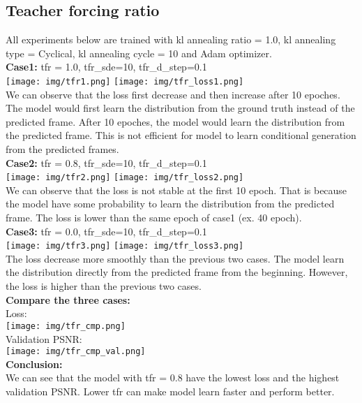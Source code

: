 \documentclass{article} %
\begin{document}
    \subsection{Teacher forcing ratio}
    All experiments below are trained with kl annealing ratio = 1.0, kl annealing type = Cyclical, kl annealing cycle = 10 and Adam optimizer.\\
    \textbf{Case1:} tfr = 1.0, tfr\_sde=10, tfr\_d\_step=0.1\\
    \texttt{[image: img/tfr1.png]}
    \texttt{[image: img/tfr\_loss1.png]} \\
    We can observe that the loss first decrease and then increase after 10 epoches.
    The model would first learn the distribution from the ground truth instead of the predicted frame.
    After 10 epoches, the model would learn the distribution from the predicted frame.
    This is not efficient for model to learn conditional generation from the predicted frames.\\
    \textbf{Case2:} tfr = 0.8, tfr\_sde=10, tfr\_d\_step=0.1\\
    \texttt{[image: img/tfr2.png]}
    \texttt{[image: img/tfr\_loss2.png]} \\
    We can observe that the loss is not stable at the first 10 epoch.
    That is because the model have some probability to learn the distribution from the predicted frame.
    The loss is lower than the same epoch of case1 (ex. 40 epoch).\\
    \textbf{Case3:} tfr = 0.0, tfr\_sde=10, tfr\_d\_step=0.1\\
    \texttt{[image: img/tfr3.png]}
    \texttt{[image: img/tfr\_loss3.png]}\\
    The loss decrease more smoothly than the previous two cases.
    The model learn the distribution directly from the predicted frame from the beginning.
    However, the loss is higher than the previous two cases. \\
    \textbf{Compare the three cases:} \\
    Loss: \\
    \texttt{[image: img/tfr\_cmp.png]} \\
    Validation PSNR: \\
    \texttt{[image: img/tfr\_cmp\_val.png]} \\
    \textbf{Conclusion:} \\
    We can see that the model with tfr = 0.8 have the lowest loss and the highest validation PSNR.
    Lower tfr can make model learn faster and perform better.\\
\end{document}
